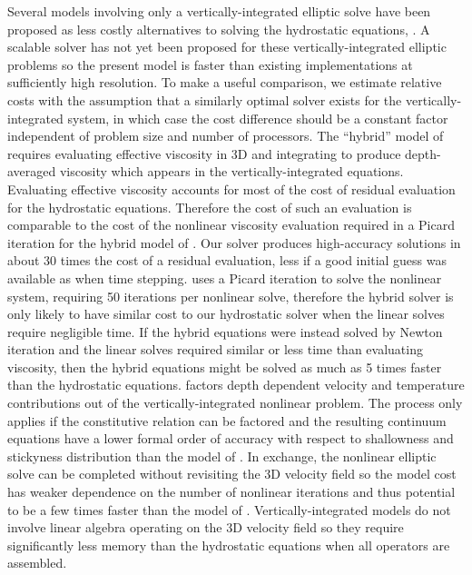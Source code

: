 Several models involving only a vertically-integrated elliptic solve have been proposed as less costly alternatives to solving the hydrostatic equations, \eg \citep{bueler2009shallow,goldberg2009grounding,goldberg2010variational}.
A scalable solver has not yet been proposed for these vertically-integrated elliptic problems so the present model is faster than existing implementations at sufficiently high resolution.
To make a useful comparison, we estimate relative costs with the assumption that a similarly optimal solver exists for the vertically-integrated system, in which case the cost difference should be a constant factor independent of problem size and number of processors.
The ``hybrid'' model of \citet{goldberg2010variational} requires evaluating effective viscosity in 3D and integrating to produce depth-averaged viscosity which appears in the vertically-integrated equations.
Evaluating effective viscosity accounts for most of the cost of residual evaluation for the hydrostatic equations.
Therefore the cost of such an evaluation is comparable to the cost of the nonlinear viscosity evaluation required in a Picard iteration for the hybrid model of \citet{goldberg2010variational}.
Our solver produces high-accuracy solutions in about 30 times the cost of a residual evaluation, less if a good initial guess was available as when time stepping.
\citet{goldberg2010variational} uses a Picard iteration to solve the nonlinear system, requiring 50 iterations per nonlinear solve, therefore the hybrid solver is only likely to have similar cost to our hydrostatic solver when the linear solves require negligible time.
If the hybrid equations were instead solved by Newton iteration and the linear solves required similar or less time than evaluating viscosity, then the hybrid equations might be solved as much as 5 times faster than the hydrostatic equations.
\citet{bueler2009shallow} factors depth dependent velocity and temperature contributions out of the vertically-integrated nonlinear problem.
The process only applies if the constitutive relation can be factored and the resulting continuum equations have a lower formal order of accuracy with respect to shallowness and stickyness distribution than the model of \citet{goldberg2010variational}.
In exchange, the nonlinear elliptic solve can be completed without revisiting the 3D velocity field so the model cost has weaker dependence on the number of nonlinear iterations and thus potential to be a few times faster than the model of \citet{goldberg2010variational}.
Vertically-integrated models do not involve linear algebra operating on the 3D velocity field so they require significantly less memory than the hydrostatic equations when all operators are assembled.

